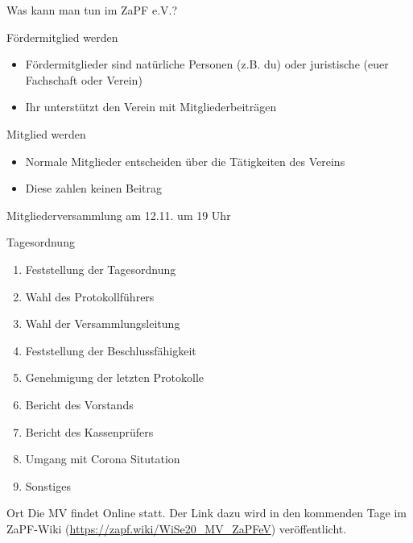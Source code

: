 \documentclass[compress, aspectratio=169]{beamer}
\begin{document}
\begin{frame}{Was kann man tun im ZaPF e.V.?}
  \begin{block}{Fördermitglied werden}
    \begin{itemize}
    \item Fördermitglieder sind natürliche Personen (z.B. du) oder juristische (euer Fachschaft oder Verein)
    \item Ihr unterstützt den Verein mit Mitgliederbeiträgen
    \end{itemize}
  \end{block}
  \begin{block}{Mitglied werden}
    \begin{itemize}
    \item Normale Mitglieder entscheiden über die Tätigkeiten des Vereins
    \item Diese zahlen keinen Beitrag
    \end{itemize}
  \end{block}
\end{frame}
  
\begin{frame}{Mitgliederversammlung am 12.11. um 19 Uhr}
  \begin{block}{Tagesordnung}
    \begin{multicols}{2}
      \begin{enumerate}\small
        \item Feststellung der Tagesordnung
        \item Wahl des Protokollführers
        \item Wahl der Versammlungsleitung
        \item Feststellung der Beschlussfähigkeit
        \item Genehmigung der letzten Protokolle
        \item Bericht des Vorstands
        \item Bericht des Kassenprüfers
        \item Umgang mit Corona Situtation
        \item Sonstiges
      \end{enumerate}
    \end{multicols}
  \end{block}
  \begin{block}{Ort}
    Die MV findet Online statt. Der Link dazu wird in den kommenden Tage im ZaPF-Wiki (\url{https://zapf.wiki/WiSe20_MV_ZaPFeV}) veröffentlicht.
  \end{block}
\end{frame}
\end{document}
